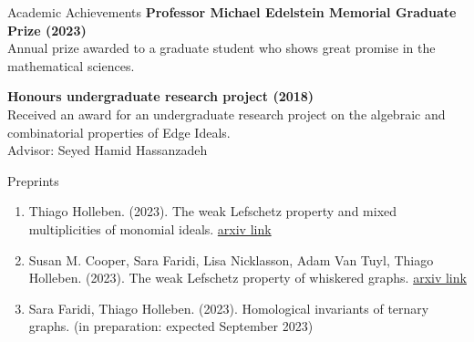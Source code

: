 \documentclass{resume} %
\begin{document}


\begin{rSection}{Academic Achievements}
{\bf Professor Michael Edelstein Memorial Graduate Prize (2023)}
\\
Annual prize awarded to a graduate student who shows great promise in the mathematical sciences. 


{\bf Honours undergraduate research project (2018)}
\\
Received an award for an undergraduate research project on the algebraic and combinatorial properties of Edge Ideals.
\\
Advisor: Seyed Hamid Hassanzadeh
\end{rSection}

\begin{rSection}{Preprints}

\begin{enumerate}[label={}]
    \item Thiago Holleben. (2023). The weak Lefschetz property and mixed multiplicities of monomial ideals.  \href{https://arxiv.org/abs/2306.13274}{arxiv link}
    \item Susan M. Cooper, Sara Faridi, Lisa Nicklasson, Adam Van Tuyl, Thiago Holleben. (2023). The weak Lefschetz property of whiskered graphs. \href{https://arxiv.org/abs/2306.04393}{arxiv link}
    \item Sara Faridi, Thiago Holleben. (2023). Homological invariants of ternary graphs. (in preparation: expected September 2023)
\end{enumerate}
\end{rSection}
\end{document}
